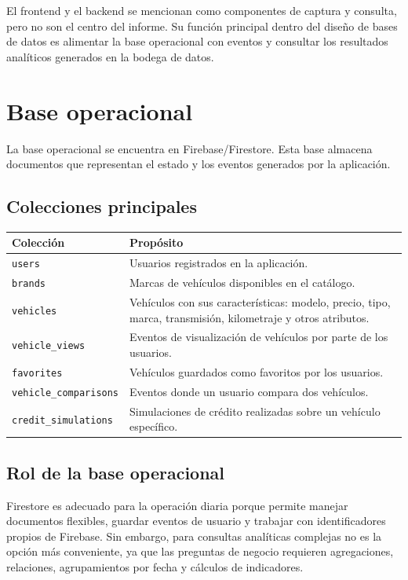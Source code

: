 \documentclass[12pt,letterpaper]{article}
\begin{document}
El frontend y el backend se mencionan como componentes de captura y consulta, pero no son el centro del informe. Su función principal dentro del diseño de bases de datos es alimentar la base operacional con eventos y consultar los resultados analíticos generados en la bodega de datos.

\section{Base operacional}

La base operacional se encuentra en Firebase/Firestore. Esta base almacena documentos que representan el estado y los eventos generados por la aplicación.

\subsection{Colecciones principales}

\begin{longtable}{p{4cm}p{10cm}}
\toprule
\textbf{Colección} & \textbf{Propósito} \\
\midrule
\endhead
\texttt{users} & Usuarios registrados en la aplicación. \\
\texttt{brands} & Marcas de vehículos disponibles en el catálogo. \\
\texttt{vehicles} & Vehículos con sus características: modelo, precio, tipo, marca, transmisión, kilometraje y otros atributos. \\
\texttt{vehicle\_views} & Eventos de visualización de vehículos por parte de los usuarios. \\
\texttt{favorites} & Vehículos guardados como favoritos por los usuarios. \\
\texttt{vehicle\_comparisons} & Eventos donde un usuario compara dos vehículos. \\
\texttt{credit\_simulations} & Simulaciones de crédito realizadas sobre un vehículo específico. \\
\bottomrule
\end{longtable}

\subsection{Rol de la base operacional}

Firestore es adecuado para la operación diaria porque permite manejar documentos flexibles, guardar eventos de usuario y trabajar con identificadores propios de Firebase. Sin embargo, para consultas analíticas complejas no es la opción más conveniente, ya que las preguntas de negocio requieren agregaciones, relaciones, agrupamientos por fecha y cálculos de indicadores.
\end{document}

